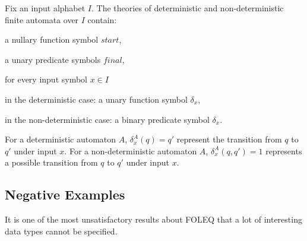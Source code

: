 Fix an input alphabet $I$.
The theories of deterministic and non-deterministic finite automata over $I$ contain:
\begin{compactitem}
  \item a nullary function symbol $\mathit{start}$,
  \item a unary predicate symbols $\mathit{final}$,
  \item for every input symbol $x\in I$
     \begin{compactitem}
       \item in the deterministic case: a unary function symbol $\delta_x$,
       \item in the non-deterministic case: a binary predicate symbol $\delta_x$.
     \end{compactitem}
\end{compactitem}

For a deterministic automaton $A$, $\delta_x^A(q)=q'$ represent the transition from $q$ to $q'$ under input $x$.
For a non-deterministic automaton $A$, $\delta_x^A(q,q')=1$ represents a possible transition from $q$ to $q'$ under input $x$.

\subsection{Negative Examples}

It is one of the most unsatisfactory results about FOLEQ that a lot of interesting data types cannot be specified.

